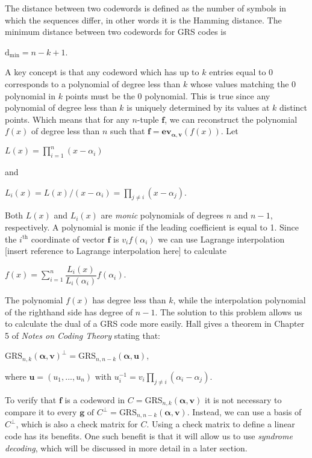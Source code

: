 \documentclass{article}
\begin{document}
The distance between two codewords is defined as the number of symbols in which the sequences differ, in other words it is the Hamming distance. The minimum distance between two codewords for GRS codes is

\begin{center}
$\text{d}_{\text{min}} = n - k + 1$.
\end{center}

A key concept is that any codeword which has up to $k$ entries equal to 0 corresponds to a polynomial of degree less than $k$ whose values matching the 0 polynomial in $k$ points must be the 0 polynomial. This is true since any polynomial of degree less than $k$ is uniquely determined by its values at $k$ distinct points. Which means that for any $n$-tuple $\textbf{f}$, we can reconstruct the polynomial $f(x)$ of degree less than $n$ such that $\textbf{f} = \textbf{ev}_{\boldsymbol\alpha,\textbf{v}}(f(x))$. Let

\begin{center}
$L(x) = \prod\limits_{i=1}^{n} (x - \alpha_{i})$
\end{center}
and
\begin{center}
$L_{i}(x) = L(x)/(x - \alpha_{i}) = \prod\limits_{j \neq i} (x - \alpha_{j})$.
\end{center}
Both $L(x)$ and $L_{i}(x)$ are \textit{monic} polynomials of degrees $n$ and $n - 1$, respectively. A polynomial is monic if the leading coefficient is equal to 1. Since the $i^{\text{th}}$ coordinate of vector $\textbf{f}$ is $v_{i}f(\alpha_{i})$ we can use Lagrange interpolation [insert reference to Lagrange interpolation here] to calculate
\begin{center}
$f(x) = \sum\limits_{i=1}^{n} \dfrac{L_{i}(x)}{L_{i}(\alpha_{i})}f(\alpha_{i})$.
\end{center}

The polynomial $f(x)$ has degree less than $k$, while the interpolation polynomial of the righthand side has degree of $n - 1$. The solution to this problem allows us to calculate the dual of a GRS code more easily. Hall gives a theorem in Chapter 5 of \textit{Notes on Coding Theory} stating that:
\begin{center}
$\text{GRS}_{n,k}(\boldsymbol\alpha, \textbf{v})^{\perp} = \text{GRS}_{n,n - k}(\boldsymbol\alpha, \textbf{u})$,
\end{center}
where $\textbf{u} = (u_{1},...,u_{n}) \text{ with } u_{i}^{-1} = v_{i}\prod\limits_{j \neq i} (\alpha_{i} - \alpha_{j})$.

To verify that $\textbf{f}$ is a codeword in $C = \text{GRS}_{n,k}(\boldsymbol\alpha, \textbf{v})$ it is not necessary to compare it to every $\textbf{g} \text{ of } C^{\perp} = \text{GRS}_{n,n-k}(\boldsymbol\alpha, \textbf{v})$. Instead, we can use a basis of $C^{\perp}$, which is also a check matrix for $C$. Using a check matrix to define a linear code has its benefits. One such benefit is that it will allow us to use \textit{syndrome decoding}, which will be discussed in more detail in a later section.
\end{document}
